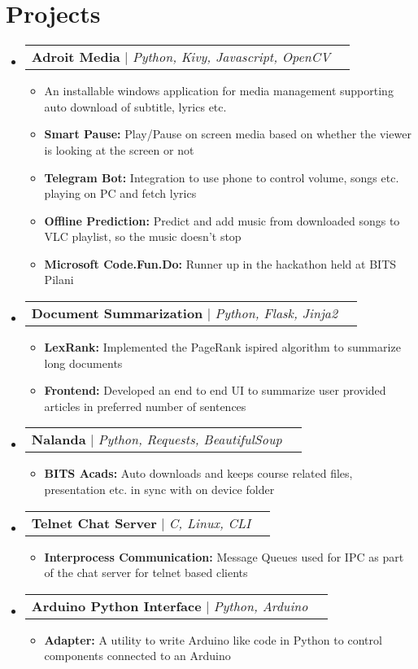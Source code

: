 \documentclass[letterpaper,11pt]{article}
\makeatletter
\newcommand{\resumeItem}[1]{
  \item\small{
    {#1 \vspace{-2pt}}
  }
}
\newcommand{\resumeProjectHeading}[2]{
    \item
    \begin{tabular*}{0.97\textwidth}{l@{\extracolsep{\fill}}r}
      \small#1 & #2 \\
    \end{tabular*}\vspace{-7pt}
}
\newcommand{\resumeSubHeadingListStart}{\begin{itemize}[leftmargin=0.15in, label={}]}
\newcommand{\resumeSubHeadingListEnd}{\end{itemize}}
\newcommand{\resumeItemListStart}{\begin{itemize}}
\newcommand{\resumeItemListEnd}{\end{itemize}\vspace{-5pt}}
\makeatother
\begin{document}
\section{Projects}
    \resumeSubHeadingListStart
      \resumeProjectHeading
          {\textbf{Adroit Media} $|$ \emph{Python, Kivy, Javascript, OpenCV}}{\href{https://adroitweb.github.io/}{\faGlobe} \href{https://github.com/triptu/AdroitMedia}{\faGithub}}
          \resumeItemListStart
            \resumeItem{An installable windows application for media management supporting auto download of subtitle, lyrics etc.}
            \resumeItem{\textbf{Smart Pause:} Play/Pause on screen media based on whether the viewer is looking at the screen or not}
            \resumeItem{\textbf{Telegram Bot:} Integration to use phone to control volume, songs etc. playing on PC and fetch lyrics}
            \resumeItem{\textbf{Offline Prediction:} Predict and add music from downloaded songs to VLC playlist, so the music doesn't stop}
            \resumeItem{\textbf{Microsoft Code.Fun.Do:} Runner up in the hackathon held at BITS Pilani}
          \resumeItemListEnd
      \resumeProjectHeading
          {\textbf{Document Summarization} $|$ \emph{Python, Flask, Jinja2}}{}
          \resumeItemListStart
            \resumeItem{\textbf{LexRank:} Implemented the PageRank ispired algorithm to summarize long documents}
            \resumeItem{\textbf{Frontend:} Developed an end to end UI to summarize user provided articles in preferred number of sentences}
          \resumeItemListEnd
       \resumeProjectHeading
          {\textbf{Nalanda} $|$ \emph{Python, Requests, BeautifulSoup}}{\href{https://github.com/triptu/Nalanda}{\faGithub}}
          \resumeItemListStart
            \resumeItem{\textbf{BITS Acads:} Auto downloads and keeps course related files, presentation etc. in sync with on device folder}
          \resumeItemListEnd
      \resumeProjectHeading
          {\textbf{Telnet Chat Server} $|$ \emph{C, Linux, CLI}}{\href{https://github.com/triptu/chat-server-np}{\faGithub}}
          \resumeItemListStart
            \resumeItem{\textbf{Interprocess Communication:} Message Queues used for IPC as part of the chat server for telnet based clients}
          \resumeItemListEnd
      \resumeProjectHeading
          {\textbf{Arduino Python Interface} $|$ \emph{Python, Arduino}}{\href{https://github.com/triptu/ardupy}{\faGithub}}
          \resumeItemListStart
            \resumeItem{\textbf{Adapter:} A utility to write Arduino like code in Python to control components connected to an Arduino}
          \resumeItemListEnd
    \resumeSubHeadingListEnd
\end{document}
